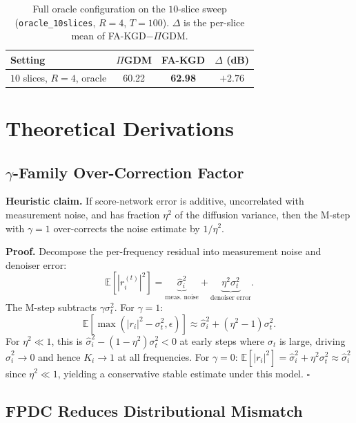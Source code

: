 \documentclass[10pt,twocolumn,letterpaper]{article}
\newcommand{\hatsig}{\hat{\sigma}}
\begin{document}
\begin{table}[h]
\centering
\caption{Full oracle configuration on the $10$-slice sweep
(\texttt{oracle\_10slices}, $R{=}4$, $T{=}100$).
$\Delta$ is the per-slice mean of FA-KGD$-\Pi$GDM.}
\label{tab:oracle10}
\begin{tabular}{lccc}
\toprule
\textbf{Setting} & $\Pi$GDM & FA-KGD & $\Delta$ (dB) \\
\midrule
$10$ slices, $R{=}4$, oracle & 60.22 & \textbf{62.98} & $\mathbf{+2.76}$ \\
\bottomrule
\end{tabular}
\end{table}

\section{Theoretical Derivations}
\label{app:theory}

\subsection{\texorpdfstring{$\gamma$-Family Over-Correction Factor}{gamma-Family Over-Correction Factor}}

\textbf{Heuristic claim.} If score-network error is additive, uncorrelated with
measurement noise, and has fraction $\eta^2$ of the diffusion variance, then
the M-step with $\gamma = 1$ over-corrects the noise estimate by $1/\eta^2$.

\textbf{Proof.} Decompose the per-frequency residual into measurement noise
and denoiser error:
\[
  \mathbb{E}[|r_i^{(t)}|^2] = \underbrace{\hatsig_i^2}_{\text{meas. noise}}
  + \underbrace{\eta^2 \sigma_t^2}_{\text{denoiser error}}.
\]
The M-step subtracts $\gamma\sigma_t^2$. For $\gamma = 1$:
\[
  \mathbb{E}[\max(|r_i|^2 - \sigma_t^2, \epsilon)]
  \approx \hatsig_i^2 + (\eta^2 - 1)\sigma_t^2.
\]
For $\eta^2 \ll 1$, this is $\hatsig_i^2 - (1-\eta^2)\sigma_t^2 < 0$ at
early steps where $\sigma_t$ is large, driving $\hatsig_i^2 \rightarrow 0$
and hence $K_i \rightarrow 1$ at all frequencies. For $\gamma = 0$:
$\mathbb{E}[|r_i|^2] = \hatsig_i^2 + \eta^2\sigma_t^2 \approx \hatsig_i^2$
since $\eta^2 \ll 1$, yielding a conservative stable estimate under this
model. \hfill $\square$

\subsection{FPDC Reduces Distributional Mismatch}
\end{document}
